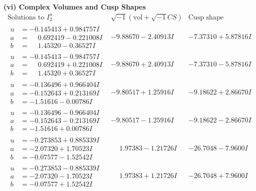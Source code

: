 \documentclass[1p]{elsarticle_modified}
\theoremstyle{definition}
\newcommand{\I}{\sqrt{-1}}
\begin{document}
\newpage\flushleft \textbf{(vi) Complex Volumes and Cusp Shapes}
$$\begin{array}{c|c|c}  
\text{Solutions to }I^u_{2}& \I (\text{vol} + \sqrt{-1}CS) & \text{Cusp shape}\\
 \hline 
\begin{aligned}
u &= -0.145413 + 0.984757 I \\
a &= \phantom{-}0.692419 - 0.221008 I \\
b &= \phantom{-}1.45320 - 0.36527 I\end{aligned}
 & -9.88670 - 2.40913 I & -7.37310 + 5.87816 I \\ \hline\begin{aligned}
u &= -0.145413 - 0.984757 I \\
a &= \phantom{-}0.692419 + 0.221008 I \\
b &= \phantom{-}1.45320 + 0.36527 I\end{aligned}
 & -9.88670 + 2.40913 I & -7.37310 - 5.87816 I \\ \hline\begin{aligned}
u &= -0.136496 + 0.966404 I \\
a &= -0.152643 + 0.213169 I \\
b &= -1.51616 - 0.00786 I\end{aligned}
 & -9.80517 + 1.25916 I & -9.18622 + 2.86670 I \\ \hline\begin{aligned}
u &= -0.136496 - 0.966404 I \\
a &= -0.152643 - 0.213169 I \\
b &= -1.51616 + 0.00786 I\end{aligned}
 & -9.80517 - 1.25916 I & -9.18622 - 2.86670 I \\ \hline\begin{aligned}
u &= -0.273853 + 0.885339 I \\
a &= -2.07320 + 1.70523 I \\
b &= -0.07577 - 1.52542 I\end{aligned}
 & \phantom{-}1.97383 - 1.21726 I & -26.7048 - 7.9600 I \\ \hline\begin{aligned}
u &= -0.273853 - 0.885339 I \\
a &= -2.07320 - 1.70523 I \\
b &= -0.07577 + 1.52542 I\end{aligned}
 & \phantom{-}1.97383 + 1.21726 I & -26.7048 + 7.9600 I \\ \hline\begin{aligned}

\end{aligned}
\end{array}$$
\end{document}
